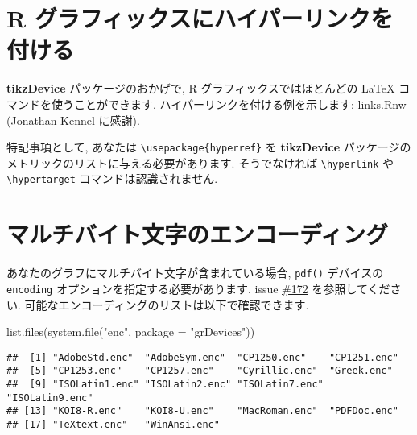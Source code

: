 \documentclass[
  xelatex,ja=standard,jafont=noto]{bxjsreport}
\newenvironment{Shaded}{\begin{snugshade}}{\end{snugshade}}
\newcommand{\AttributeTok}[1]{\textcolor[rgb]{0.77,0.63,0.00}{#1}}
\newcommand{\FunctionTok}[1]{\textcolor[rgb]{0.00,0.00,0.00}{#1}}
\newcommand{\NormalTok}[1]{#1}
\newcommand{\StringTok}[1]{\textcolor[rgb]{0.31,0.60,0.02}{#1}}
\begin{document}
\hypertarget{r-ux30b0ux30e9ux30d5ux30a3ux30c3ux30afux30b9ux306bux30cfux30a4ux30d1ux30fcux30eaux30f3ux30afux3092ux4ed8ux3051ux308b}{%
\section*{R
グラフィックスにハイパーリンクを付ける}\label{r-ux30b0ux30e9ux30d5ux30a3ux30c3ux30afux30b9ux306bux30cfux30a4ux30d1ux30fcux30eaux30f3ux30afux3092ux4ed8ux3051ux308b}}

\textbf{tikzDevice} パッケージのおかげで, R グラフィックスではほとんどの
LaTeX コマンドを使うことができます. ハイパーリンクを付ける例を示します:
\href{https://gist.github.com/1937313}{links.Rnw} (Jonathan Kennel
に感謝).

特記事項として, あなたは \texttt{\textbackslash{}usepackage\{hyperref\}}
を \textbf{tikzDevice}
パッケージのメトリックのリストに与える必要があります. そうでなければ
\texttt{\textbackslash{}hyperlink} や
\texttt{\textbackslash{}hypertarget} コマンドは認識されません.

\hypertarget{ux30deux30ebux30c1ux30d0ux30a4ux30c8ux6587ux5b57ux306eux30a8ux30f3ux30b3ux30fcux30c7ux30a3ux30f3ux30b0}{%
\section*{マルチバイト文字のエンコーディング}\label{ux30deux30ebux30c1ux30d0ux30a4ux30c8ux6587ux5b57ux306eux30a8ux30f3ux30b3ux30fcux30c7ux30a3ux30f3ux30b0}}

あなたのグラフにマルチバイト文字が含まれている場合, \texttt{pdf()}
デバイスの \texttt{encoding} オプションを指定する必要があります. issue
\href{https://github.com/yihui/knitr/issues/172}{\#172}
を参照してください. 可能なエンコーディングのリストは以下で確認できます.

\begin{Shaded}
\begin{Highlighting}[numbers=left,,]
\FunctionTok{list.files}\NormalTok{(}\FunctionTok{system.file}\NormalTok{(}\StringTok{"enc"}\NormalTok{, }\AttributeTok{package =} \StringTok{"grDevices"}\NormalTok{))}
\end{Highlighting}
\end{Shaded}

\begin{verbatim}
##  [1] "AdobeStd.enc"  "AdobeSym.enc"  "CP1250.enc"    "CP1251.enc"   
##  [5] "CP1253.enc"    "CP1257.enc"    "Cyrillic.enc"  "Greek.enc"    
##  [9] "ISOLatin1.enc" "ISOLatin2.enc" "ISOLatin7.enc" "ISOLatin9.enc"
## [13] "KOI8-R.enc"    "KOI8-U.enc"    "MacRoman.enc"  "PDFDoc.enc"   
## [17] "TeXtext.enc"   "WinAnsi.enc"
\end{verbatim}
\end{document}
